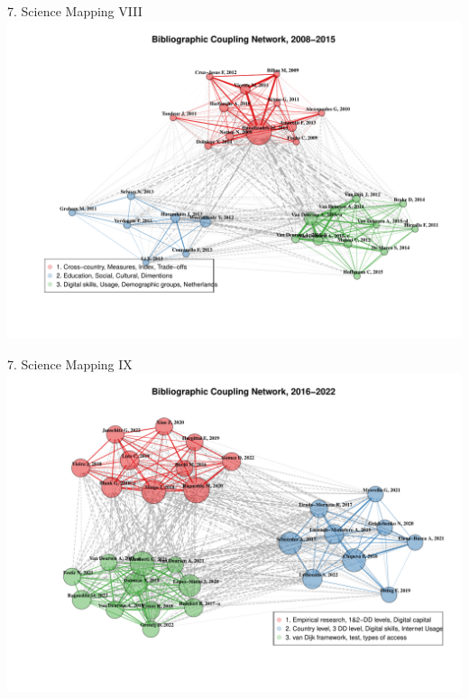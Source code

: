 \documentclass[
  ignorenonframetext,
]{beamer}
\begin{document}
\begin{frame}{7. Science Mapping VIII}
\protect\hypertarget{science-mapping-viii}{}
\includegraphics{Presentation_bibliometric_files/figure-beamer/Bib_coup_P2-1.pdf}
\end{frame}

\begin{frame}{7. Science Mapping IX}
\protect\hypertarget{science-mapping-ix}{}
\includegraphics{Presentation_bibliometric_files/figure-beamer/Bib_coup_P3-1.pdf}
\end{frame}
\end{document}
